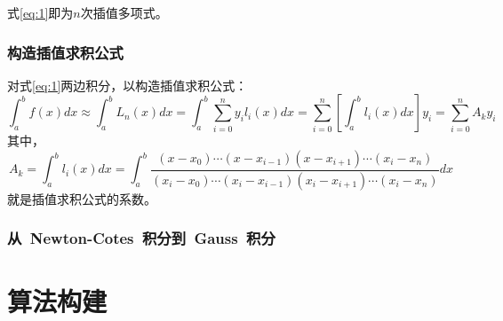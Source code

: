 \documentclass[UTF8,a4paper]{ctexart}
\begin{document}
\begin{spacing}{1.5}
式\eqref{eq:1}即为$n$次插值多项式。

\section{构造插值求积公式}

对式\eqref{eq:1}两边积分，以构造插值求积公式：
\begin{equation}
\boxed{
\int _a^b f(x)dx \approx \int _a^b L_n(x)dx = \int_a^b \sum \limits _{i=0}^n y_il_i(x)dx = \sum_{i=0}^n\left[ \int_a^b l_i (x) dx \right]y_i = \sum \limits _{i=0}^{n}A_{k}y_i
}
\end{equation}
其中，
\begin{equation}
A_k = \int_a^b l_i (x) dx = \int_a^b \dfrac{ (x-x_0)\cdots(x-x_{i-1})(x-x_{i+1})\cdots(x_i-x_n) }{ (x_i-x_0)\cdots(x_i-x_{i-1})(x_i-x_{i+1})\cdots(x_i-x_n) }dx
\end{equation}
就是插值求积公式的系数。
\section{从~Newton-Cotes~积分到~Gauss~积分}
\part{算法构建}

\end{spacing}
\end{document}
